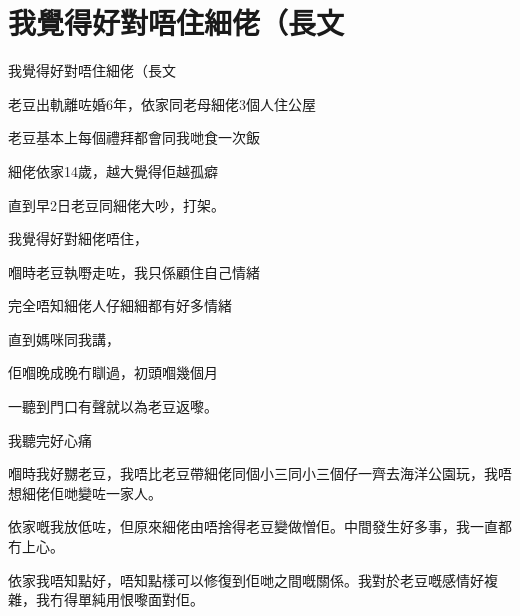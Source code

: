 \chapter{我覺得好對唔住細佬（長文}

我覺得好對唔住細佬（長文

老豆出軌離咗婚6年，依家同老母細佬3個人住公屋

老豆基本上每個禮拜都會同我哋食一次飯

細佬依家14歲，越大覺得佢越孤癖

直到早2日老豆同細佬大吵，打架。

我覺得好對細佬唔住，

嗰時老豆執嘢走咗，我只係顧住自己情緒

完全唔知細佬人仔細細都有好多情緒

直到媽咪同我講，

佢嗰晚成晚冇瞓過，初頭嗰幾個月

一聽到門口有聲就以為老豆返嚟。

我聽完好心痛

嗰時我好嬲老豆，我唔比老豆帶細佬同個小三同小三個仔一齊去海洋公園玩，我唔想細佬佢哋變咗一家人。

依家嘅我放低咗，但原來細佬由唔捨得老豆變做憎佢。中間發生好多事，我一直都冇上心。

依家我唔知點好，唔知點樣可以修復到佢哋之間嘅關係。我對於老豆嘅感情好複雜，我冇得單純用恨嚟面對佢。

